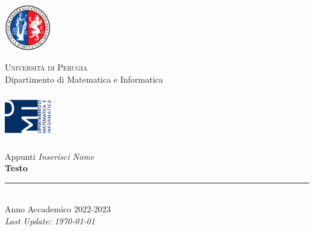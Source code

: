 
\thispagestyle{empty} %

\noindent %
\includegraphics[width=0.15\textwidth]{frontmatter/imgs/logoUniPg.jpg}
\begin{minipage}[b]{0.7\textwidth}
    \centering
    {\Large \textsc{Universit{\`a} di Perugia}}\\
    \vspace{0.4 em}
    {\large Dipartimento di Matematica e Informatica}
    \vspace{0.6 em}
\end{minipage}%
\includegraphics[width=0.15\textwidth]{frontmatter/imgs/logoDMI.jpg}

\vspace{8 em}

\begin{center}
    {\Huge Appunti \textit{Inserisci Nome}}\\
    \vspace{5 em}
    {\Huge \textbf{Testo}}\\
    
    \vfill
    
    \rule{380pt}{.4pt}\\
    \vspace{1.2 em}
    \large{Anno Accademico 2022-2023}\\
    \vspace{.9 em}
    \small{\textit{Last Update: \today{}}}
\end{center}

